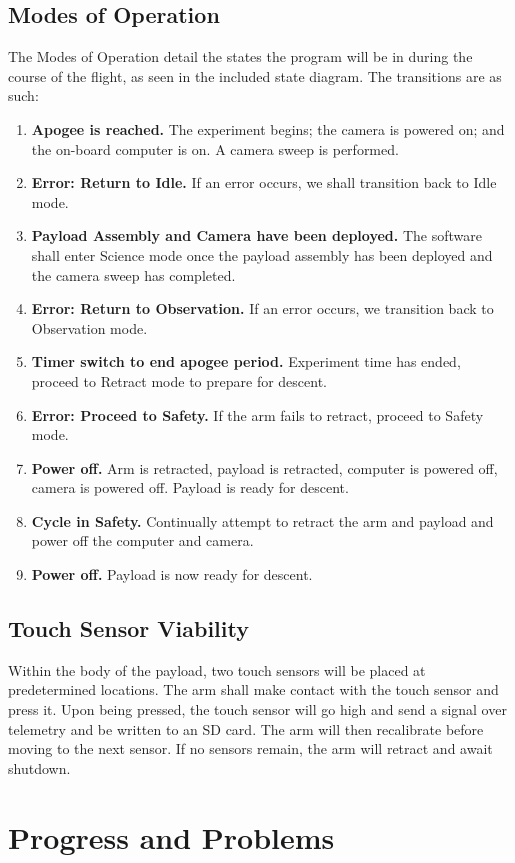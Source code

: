 \documentclass[letterpaper,10pt]{article}
\begin{document}
\subsection{Modes of Operation}

The Modes of Operation detail the states the program will be in during the course of the flight, as seen in the included state diagram. The transitions are as such:
\begin{enumerate}
\item{\textbf{Apogee is reached.} The experiment begins; the camera is powered on; and the on-board 
computer is on. A camera sweep is performed.}
\item{\textbf{Error: Return to Idle.} If an error occurs, we shall transition back to Idle mode.}
\item{\textbf{Payload Assembly and Camera have been deployed.} The software shall enter Science
mode once the payload assembly has been deployed and the camera sweep has completed.}
\item{\textbf{Error: Return to Observation.} If an error occurs, we transition back to Observation mode.}
\item{\textbf{Timer switch to end apogee period.} Experiment time has ended, proceed to Retract mode 
to prepare for descent.}
 \item{\textbf{Error: Proceed to Safety.} If the arm fails to retract, proceed to Safety mode.}
 \item{\textbf{Power off.} Arm is retracted, payload is retracted, computer is powered off, camera is 
 powered off. Payload is ready for descent.}
 \item{\textbf{Cycle in Safety.} Continually attempt to retract the arm and payload and power off the 
 computer and camera.}
 \item{\textbf{Power off.} Payload is now ready for descent.}
\end{enumerate}
\subsection{Touch Sensor Viability}
Within the body of the payload, two touch sensors will be placed at predetermined locations.
The arm shall make contact with the touch sensor and press it.
Upon being pressed, the touch sensor will go high and send a signal over telemetry and be written to
an SD card. The arm will then recalibrate before moving to the next sensor. If no sensors remain, 
the arm will retract and await shutdown.

\section{Progress and Problems}
\end{document}
